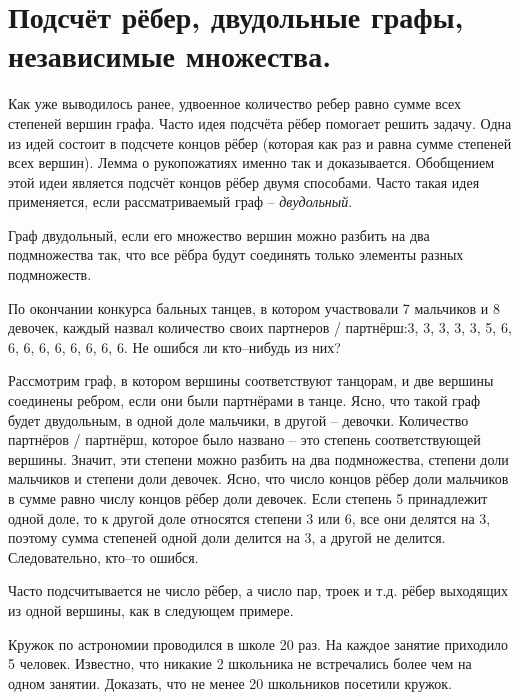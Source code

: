 

\section{Подсчёт рёбер, двудольные графы, независимые множества.}

Как уже выводилось ранее, удвоенное количество ребер равно сумме всех степеней вершин графа. Часто идея подсчёта рёбер помогает решить задачу. Одна из идей состоит в подсчете концов рёбер (которая как раз и равна сумме степеней всех вершин). Лемма о рукопожатиях именно так и доказывается. Обобщением этой идеи является подсчёт концов рёбер двумя способами. Часто такая идея применяется, если рассматриваемый граф -- \textit{двудольный}.

\begin{dfn}
    Граф двудольный, если его множество вершин можно разбить на два подмножества так, что все рёбра будут соединять только элементы разных подмножеств.
\end{dfn}

\begin{thm}
    По окончании конкурса бальных танцев, в котором участвовали 7 мальчиков и 8 девочек, каждый назвал количество своих партнеров / партнёрш:3, 3, 3, 3, 3, 5, 6, 6, 6, 6, 6, 6, 6, 6, 6. Не ошибся ли кто--нибудь из них?
\end{thm}

\begin{prf}
    Рассмотрим граф, в котором вершины соответствуют танцорам, и две вершины соединены ребром, если они были партнёрами в танце. Ясно, что такой граф будет двудольным, в одной доле мальчики, в другой -- девочки. Количество партнёров / партнёрш, которое было названо -- это степень соответствующей вершины. Значит, эти степени можно разбить на два подмножества, степени доли мальчиков и степени доли девочек. Ясно, что число концов рёбер доли мальчиков в сумме равно числу концов рёбер доли девочек. Если степень 5 принадлежит одной доле, то к другой доле относятся степени 3 или 6, все они делятся на 3, поэтому сумма степеней одной доли делится на 3, а другой не делится. Следовательно, кто--то ошибся.  
\end{prf}

Часто подсчитывается не число рёбер, а число пар, троек и т.д. рёбер выходящих из одной вершины, как в следующем примере.

\begin{thm}
    Кружок по астрономии проводился в школе 20 раз. На каждое занятие приходило 5 человек. Известно, что никакие 2 школьника не встречались более чем на одном занятии. Доказать, что не менее 20 школьников посетили кружок.
\end{thm}

